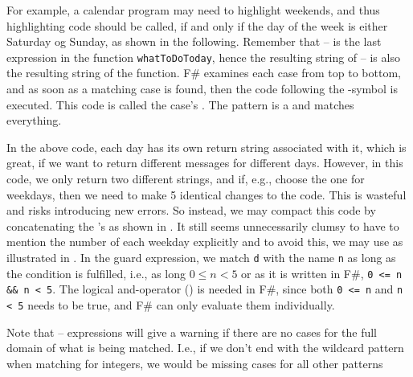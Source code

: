 \documentclass[fsharpNotes.tex]{subfiles}
\begin{document}
For example, a calendar program may need to highlight weekends, and thus highlighting code should be called, if and only if the day of the week is either Saturday og Sunday, as shown in the following. 
%
%
Remember that  --  is the last expression in the function \lstinline{whatToDoToday}, hence the resulting string of  --  is also the resulting string of the function. F\# examines each case from top to bottom, and as soon as a matching case is found, then the code following the \lexeme{->}-symbol is executed. This code is called the case's . The \lexeme{_} pattern is a  and matches everything.

In the above code, each day has its own return string associated with it, which is great, if we want to return different messages for different days. However, in this code, we only return two different strings, and if, e.g., choose the one for weekdays, then we need to make 5 identical changes to the code. This is wasteful and risks introducing new errors. So instead, we may compact this code by concatenating the \lexeme{|}'s as shown in .
% 
%
It still seems unnecessarily clumsy to have to mention the number of each weekday explicitly and to avoid this, we may use  as illustrated in .
% 
%
In the guard expression, we match \lstinline{d} with the name \lstinline{n} as long as the condition is fulfilled, i.e., as long $0\leq n <5$ or as it is written in F\#, \lstinline{0 <= n && n < 5}. The logical and-operator (\lexeme{&&}) is needed in F\#, since both \lstinline{0 <= n} and \lstinline{n < 5} needs to be true, and F\# can only evaluate them individually.

Note that  --  expressions will give a warning if there are no cases for the full domain of what is being matched. I.e., if we don't end with the wildcard pattern when matching for integers, we would be missing cases for all other patterns
%
%
\end{document}
